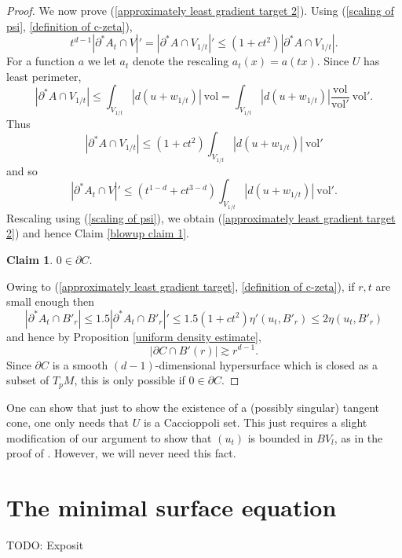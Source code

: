 \documentclass[reqno,12pt,letterpaper]{amsart}
\newcommand{\vol}{\mathrm{vol}}
\newtheorem{claim}[theorem]{Claim}
\theoremstyle{definition}
\numberwithin{equation}{section}
\begin{document}
\begin{proof}
We now prove (\ref{approximately least gradient target 2}).
Using (\ref{scaling of psi}, \ref{definition of c-zeta}),
$$t^{d - 1} | \partial^* A_t \cap V|' = |\partial^* A \cap V_{1/t}|' \leq (1 + ct^2) |\partial^* A \cap V_{1/t}|.$$
For a function $a$ we let $a_t$ denote the rescaling $a_t(x) = a(tx)$.
Since $U$ has least perimeter,
$$|\partial^* A \cap V_{1/t}| \leq \int_{V_{1/t}} |d(u + w_{1/t})| ~\vol = \int_{V_{1/t}} |d(u + w_{1/t})| \frac{\vol}{\vol'} ~\vol'.$$
Thus
$$|\partial^* A \cap V_{1/t}| \leq (1 + ct^2) \int_{V_{1/t}} |d(u + w_{1/t})| ~\vol'$$
and so
$$|\partial^* A_t \cap V|' \leq (t^{1 - d} + ct^{3 - d}) \int_{V_{1/t}} |d(u + w_{1/t})| ~\vol'.$$
Rescaling using (\ref{scaling of psi}), we obtain (\ref{approximately least gradient target 2}) and hence Claim \ref{blowup claim 1}.

\begin{claim}
$0 \in \partial C$.
\end{claim}

Owing to (\ref{approximately least gradient target}, \ref{definition of c-zeta}), if $r,t$ are small enough then
$$|\partial^* A_t \cap B'_r| \leq 1.5|\partial^* A_t \cap B'_r|' \leq 1.5(1 + ct^2) \eta'(u_t, B'_r) \leq 2 \eta(u_t, B'_r)$$
and hence by Proposition \ref{uniform density estimate},
$$|\partial C \cap B'(r)| \gtrsim r^{d - 1}.$$
Since $\partial C$ is a smooth $(d-1)$-dimensional hypersurface which is closed as a subset of $T_pM$, this is only possible if $0 \in \partial C$.
\end{proof}

One can show that just to show the existence of a (possibly singular) tangent cone, one only needs that $U$ is a Caccioppoli set.
This just requires a slight modification of our argument to show that $(u_t)$ is bounded in $BV_l$, as in the proof of \cite[Theorem 9.3]{Giusti77}.
However, we will never need this fact.


\section{The minimal surface equation}
TODO: Exposit
\end{document}
